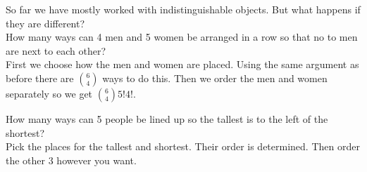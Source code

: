 \documentclass[14,fleqn]{article}
\begin{document}
So far we have mostly worked with indistinguishable objects. But what happens if they are different?\\
How many ways can 4 men and 5 women be arranged in a row so that no to men are next to each other?\\
First we choose how the men and women are placed. Using the same argument as before there are $\binom{6}{4}$ ways to do  this. Then we order the men and women separately so we get $\binom{6}{4} 5!4!$.


How many ways can 5 people be lined up so the tallest is to the left of the shortest?\\
Pick the places for the tallest and shortest. Their order is determined. Then order the other 3 however you want.\\
\end{document}
